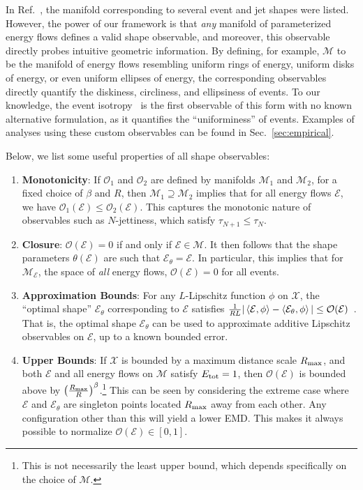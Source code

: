 \documentclass[letterpaper,11pt]{article}
\newcommand{\E}{\mathcal{E}}
\newcommand{\M}{\mathcal{M}}
\renewcommand{\O}{\mathcal{O}}
\DeclareRobustCommand{\Sec}[1]{Sec.~\ref{sec:#1}}
\DeclareRobustCommand{\Refer}[1]{Ref.~\cite{#1}}
\begin{document}
In \Refer{2020}, the manifold corresponding to several event and jet shapes were listed. However, the power of our framework is that \emph{any} manifold of parameterized energy flows defines a valid shape observable, and moreover, this observable directly probes intuitive geometric information. By defining, for example, $\M$ to be the manifold of energy flows resembling uniform rings of energy, uniform disks of energy, or even uniform ellipses of energy, the corresponding observables directly quantify the diskiness, circliness, and ellipsiness of events. To our knowledge, the event isotropy~\cite{Cesarotti:2020hwb} is the first observable of this form with no known alternative formulation, as it quantifies the ``uniforminess'' of events. Examples of analyses using these custom observables can be found in \Sec{empirical}.

Below, we list some useful properties of all shape observables:

\begin{enumerate}
    \item \textbf{Monotonicity}: If $\mathcal{O}_1$ and $\mathcal{O}_2$ are defined by manifolds $\M_1$ and $\M_2$, for a fixed choice of $\beta$ and $R$, then $\M_1 \supseteq \M_2$ implies that for all energy flows $\E$, we have $\mathcal{O}_1(\E) \leq \mathcal{O}_2(\E)$. This captures the monotonic nature of observables such as $N$-jettiness, which satisfy $\tau_{N+1} \leq \tau_N$.
    \item \textbf{Closure}: $\mathcal{O}(\E) = 0$ if and only if $\E \in \M$. It then follows that the shape parameters $\theta(\E)$ are such that $\E_\theta = \E$. In particular, this implies that for $\M_\E$, the space of \emph{all} energy flows, $\O(\E) = 0$ for all events. 
    \item \textbf{Approximation Bounds}:  For any $L$-Lipschitz function $\phi$ on $\mathcal{X}$, the ``optimal shape'' $\E_\theta$ corresponding to $\E$ satisfies $\frac{1}{RL}|\expval{\E,\phi}-\expval{\E_\theta, \phi}| \leq \mathcal{O}(\E)$~\cite{Komiske_2019}. That is, the optimal shape $\E_\theta$ can be used to approximate additive Lipschitz observables on $\E$, up to a known bounded error. 
    \item  \textbf{Upper Bounds}: If $\mathcal{X}$ is bounded by a maximum distance scale $R_{\rm max}$, and both $\E$ and all energy flows on $\M$ satisfy $E_{\rm tot} = 1$, then $\mathcal{O}(\E)$ is bounded above by $\left(\frac{R_{\rm max}}{R}\right)^\beta$.\footnote{This is not necessarily the least upper bound, which depends specifically on the choice of $\M$.} This can be seen by considering the extreme case where $\E$ and $\E_\theta$ are singleton points located $R_{\rm max}$ away from each other. Any configuration other than this will yield a lower EMD. This makes it always possible to normalize $\mathcal{O}(\E) \in [0,1]$. 
\end{enumerate}
\end{document}
